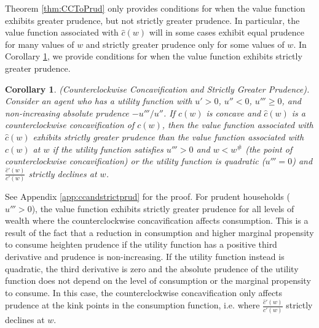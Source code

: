 \documentclass[titlepage]{\econtex}
\newtheorem{corollary}{Corollary}
\begin{document}
Theorem \ref{thm:CCToPrud} only provides conditions for when the value function exhibits greater prudence, but not strictly greater prudence. In particular, the value function associated with $\hat{c}(w)$ will in some cases exhibit equal prudence for many values of $w$ and strictly greater prudence only for some values of $w$. In Corollary \ref{cor:ccandstrictprud}, we provide conditions for when the value function exhibits strictly greater prudence.

\begin{corollary} \label{cor:ccandstrictprud}(Counterclockwise Concavification and Strictly Greater Prudence).\\
	Consider an agent who has a utility function with $u' > 0$, $u'' < 0$, $u''' \geq 0$, and non-increasing absolute prudence $-u'''/u''$. If $c(w)$ is concave and $\hat{c}(w)$ is a counterclockwise concavification of $c(w)$, then the value function associated with $\hat{c}(w)$ exhibits strictly greater prudence than the value function associated with $c(w)$ at $w$ if the utility function satisfies $u''' > 0$ and $w < w^{\#}$ (the point of counterclockwise concavification) or the utility function is quadratic ($u''' = 0$) and $\frac{\hat{c}'(w)}{c'(w)}$ strictly declines at $w$.
\end{corollary}
\noindent See Appendix \ref{app:ccandstrictprud} for the proof. For prudent households ($u''' > 0$), the value function exhibits strictly greater prudence for all levels of wealth where the counterclockwise concavification affects consumption. This is a result of the fact that a reduction in consumption and higher marginal propensity to consume heighten prudence if the utility function has a positive third derivative and prudence is non-increasing. If the utility function instead is quadratic, the third derivative is zero and the absolute prudence of the utility function does not depend on the level of consumption or the marginal propensity to consume. In this case, the counterclockwise concavification only affects prudence at the kink points in the consumption function, i.e. where $\frac{\hat{c}'(w)}{c'(w)}$ strictly declines at $w$.
\end{document}

